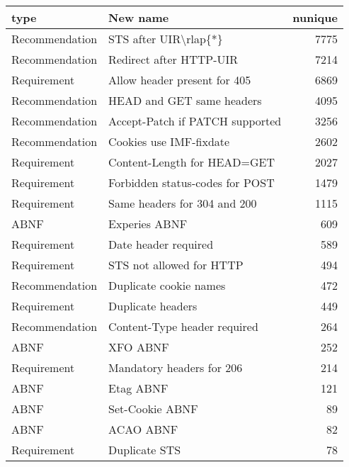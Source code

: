 \begin{tabular}{llr}
\toprule
          type &                                    New name &  nunique \\
\midrule
Recommendation &                       STS after UIR\textbackslash rlap\{*\} &     7775 \\
Recommendation &                     Redirect after HTTP-UIR &     7214 \\
   Requirement &                Allow header present for 405 &     6869 \\
Recommendation &                   HEAD and GET same headers &     4095 \\
Recommendation &             Accept-Patch if PATCH supported &     3256 \\
Recommendation &                     Cookies use IMF-fixdate &     2602 \\
   Requirement &                 Content-Length for HEAD=GET &     2027 \\
   Requirement &             Forbidden status-codes for POST &     1479 \\
   Requirement &                Same headers for 304 and 200 &     1115 \\
          ABNF &                               Experies ABNF &      609 \\
   Requirement &                        Date header required &      589 \\
   Requirement &                    STS not allowed for HTTP &      494 \\
Recommendation &                      Duplicate cookie names &      472 \\
   Requirement &                           Duplicate headers &      449 \\
Recommendation &                Content-Type header required &      264 \\
          ABNF &                                    XFO ABNF &      252 \\
   Requirement &                   Mandatory headers for 206 &      214 \\
          ABNF &                                   Etag ABNF &      121 \\
          ABNF &                             Set-Cookie ABNF &       89 \\
          ABNF &                                   ACAO ABNF &       82 \\
   Requirement &                               Duplicate STS &       78 \\

\end{tabular}
